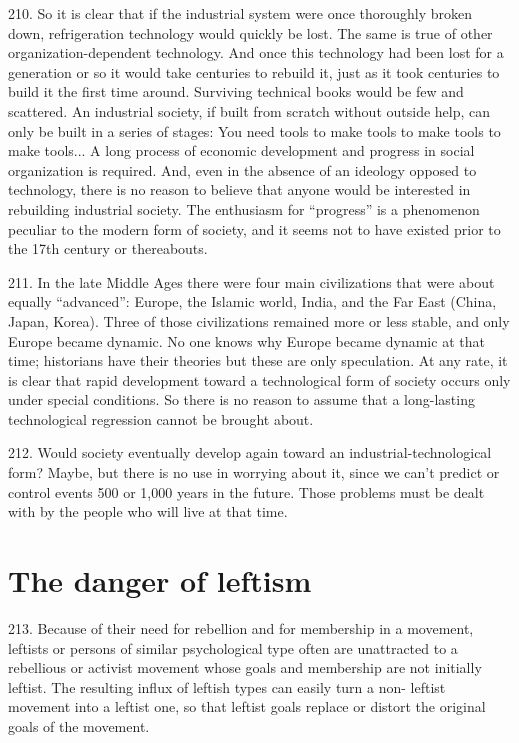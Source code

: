 \documentclass{article}
\begin{document}
210.  So it is clear that if the industrial system were once thoroughly broken down, refrigeration 
technology would quickly be lost.  The same is true of other organization-dependent 
technology.  And once this technology had been lost for a generation or so it would take centuries 
to rebuild it, just as it took centuries to build it the first time around.  Surviving technical books 
would be few and scattered.  An industrial society, if built from scratch without outside help, can 
only be built in a series of stages: You need tools to make tools to make tools to make tools... A 
long process of economic development and progress in social organization is required.  And, even 
in  the  absence  of  an  ideology  opposed  to  technology,  there  is  no  reason  to  believe  that  anyone  
would be interested in rebuilding industrial society.  The enthusiasm for “progress” is a 
phenomenon peculiar to the modern form of society, and it seems not to have existed prior to the 
17th century or thereabouts. \vspace{\baselineskip}

211.  In  the  late  Middle  Ages  there  were  four  main  civilizations  that  were  about  equally  
“advanced”: Europe, the Islamic world, India, and the Far East (China, Japan, Korea).  Three of 
those civilizations remained more or less stable, and only Europe became dynamic.  No one knows 
why  Europe  became  dynamic  at  that  time;  historians  have  their  theories  but  these  are  only  
speculation.  At any rate, it is clear that rapid development toward a technological form of society 
occurs  only  under  special  conditions.   So  there  is  no  reason  to  assume  that  a  long-lasting 
technological regression cannot be brought about. \vspace{\baselineskip}

212.  Would  society  eventually  develop  again  toward  an  industrial-technological  form?  Maybe,  
but there is no use in worrying about it, since we can’t predict or control events 500 or 1,000 years 
in the future.  Those problems must be dealt with by the people who will live at that time. 


\section{The danger of leftism}

\hspace{0.5cm} 213.  Because of their need for rebellion and for membership in a movement, leftists or persons of 
similar psychological type often are unattracted to a rebellious or activist movement whose goals 
and membership are not initially leftist.  The resulting influx of leftish types can easily turn a non-
leftist movement into a leftist one, so that leftist goals replace or distort the original goals of the 
movement. \vspace{\baselineskip} \newpage
\end{document}
